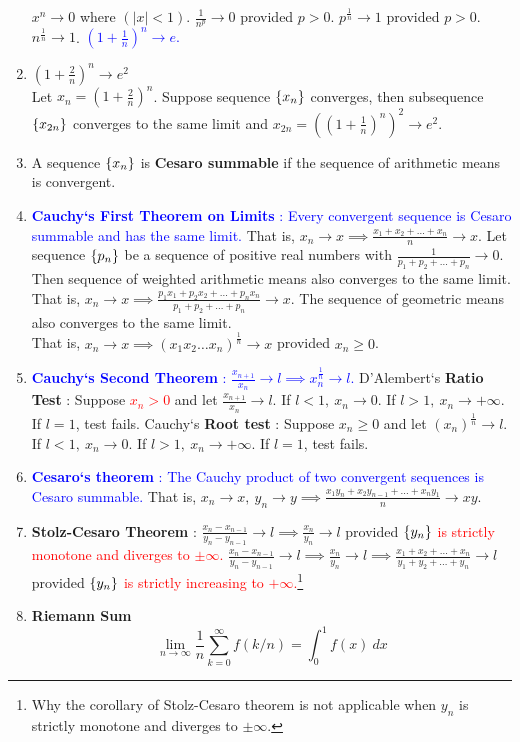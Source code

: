 \begin{enumerate}
		\subitem $x^n \to 0$ where $(|x| < 1)$.
		\subitem $\frac{1}{n^p} \to 0$ provided $p > 0$.
		\subitem $p^\frac{1}{n} \to 1$ provided $p > 0$.
		\subitem $n^\frac{1}{n} \to 1$.
		\subitem \textcolor{blue}{$(1+\frac{1}{n})^n \to e$.}
	\item $(1+\frac{2}{n})^n \to e^2$\\
		Let $x_n = (1+\frac{2}{n})^n$. Suppose sequence $\{x_n\}$ converges, then subsequence $\{x_{2n}\}$ converges to the same limit and $x_{2n} = \left((1+\frac{1}{n})^n\right)^2 \to e^2$.
	\item A sequence $\{x_n\}$ is \textbf{Cesaro summable} if the sequence of arithmetic means is convergent.
\item \textcolor{blue}{\textbf{Cauchy`s First Theorem on Limits} : Every convergent sequence is Cesaro summable and has the same limit.} That is, $x_n \to x \implies \frac{x_1+x_2+\dots+x_n}{n} \to x$.
	\subitem Let sequence $\{p_n\}$ be a sequence of positive real numbers with $\frac{1}{p_1+p_2+\dots+p_n} \to 0$. Then sequence of weighted arithmetic means also converges to the same limit.\\ That is, $x_n \to x \implies \frac{p_1x_1 + p_2x_2 + \dots + p_nx_n}{p_1+p_2+\dots+p_n} \to x$.
		\subitem The sequence of geometric means also converges to the same limit.\\ That is, $x_n \to x \implies (x_1x_2\dots x_n)^\frac{1}{n} \to x$ provided $x_n \ge 0$.
	\item \textcolor{blue}{\textbf{Cauchy`s Second Theorem} : $ \frac{x_{n+1}}{x_n} \to l \implies x_n^\frac{1}{n} \to l$.}
		\subitem D'Alembert`s \textbf{Ratio Test} : Suppose \textcolor{red}{$x_n > 0$} and let $\frac{x_{n+1}}{x_n} \to l$.
		If $l < 1,\ x_n \to 0$. If $l > 1,\ x_n \to +\infty$. If $l = 1$, test fails.
		\subitem Cauchy`s \textbf{Root test} : Suppose $x_n \ge 0$ and let $ (x_n)^{\frac{1}{n}} \to l$.
		If $l < 1,\ x_n \to 0$. If $l > 1,\ x_n \to +\infty$. If $l = 1$, test fails.
	\item \textcolor{blue}{\textbf{Cesaro`s theorem} : The Cauchy product of two convergent sequences is Cesaro summable.} That is, $x_n \to x,\ y_n \to y \implies \frac{x_1y_n + x_2y_{n-1} + \dots + x_ny_1}{n} \to xy$.
	\item \textbf{Stolz-Cesaro Theorem} : $\frac{x_n-x_{n-1}}{y_n-y_{n-1}} \to l \implies \frac{x_n}{y_n} \to l$ provided \textcolor{red}{$\{y_n\}$ is strictly monotone and diverges to $\pm \infty$.}
		\subitem $\frac{x_n-x_{n-1}}{y_n-y_{n-1}} \to l \implies \frac{x_n}{y_n} \to l \implies \frac{x_1+x_2+\dots+x_n}{y_1+y_2+\dots+y_n} \to l$ provided \textcolor{red}{$\{y_n\}$ is strictly increasing to $+\infty$.}\footnote{Why the corollary of Stolz-Cesaro theorem is not applicable when $y_n$ is strictly monotone and diverges to $\pm \infty$.}
	\item \textbf{Riemann Sum}
		\[ \lim_{n \to \infty} \frac{1}{n} \sum_{k=0}^\infty f(k/n) = \int_0^1 f(x)\ dx \]
\end{enumerate}

